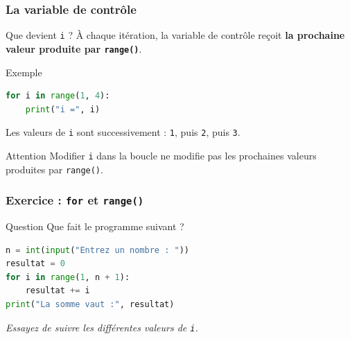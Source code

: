 \documentclass[10pt]{beamer}
\begin{document}
\begin{frame}[containsverbatim]
	\frametitle{La variable de contrôle}
	
	\begin{block}{Que devient \texttt{i} ?}
		À chaque itération, la variable de contrôle reçoit
		\textbf{la prochaine valeur produite par \texttt{range()}}.
	\end{block}
	
	\vspace{0.15cm}
	
	\begin{exampleblock}{Exemple}
\begin{lstlisting}[language=Python]
for i in range(1, 4):
	print("i =", i)
\end{lstlisting}
		\centering
		Les valeurs de \texttt{i} sont successivement :
		\texttt{1}, puis \texttt{2}, puis \texttt{3}.
	\end{exampleblock}
	
	\vspace{0.1cm}
	
	\begin{alertblock}{Attention}
		Modifier \texttt{i} dans la boucle ne modifie pas
		les prochaines valeurs produites par \texttt{range()}.
	\end{alertblock}
\end{frame}

\begin{frame}[containsverbatim]
	\frametitle{Exercice : \texttt{for} et \texttt{range()}}
	
	
	\begin{alertblock}{Question}
		Que fait le programme suivant ?
	\end{alertblock}
	
	\vspace{0.15cm}
	
	\begin{exampleblock}{}
		\begin{lstlisting}[language=Python]
n = int(input("Entrez un nombre : "))
resultat = 0
for i in range(1, n + 1):
	resultat += i
print("La somme vaut :", resultat)
		\end{lstlisting}
	\end{exampleblock}
	
	
	\vspace{0.1cm}
	
	\centering
	\textit{Essayez de suivre les différentes valeurs de \texttt{i}.}
	
	
\end{frame}
\end{document}

